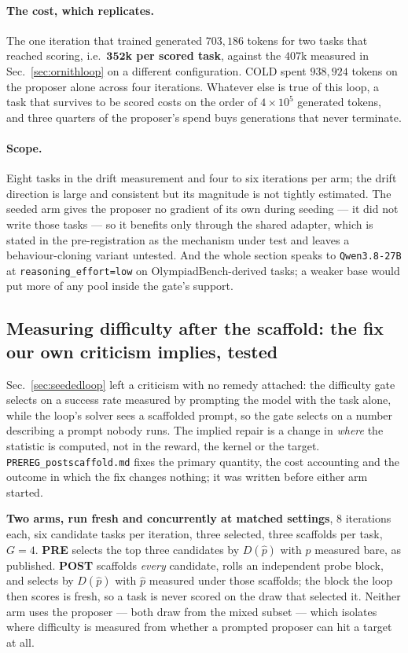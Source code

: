 \paragraph{The cost, which replicates.} The one iteration that trained generated $703{,}186$
tokens for two tasks that reached scoring, i.e.\ $\mathbf{352}$\textbf{k per scored task},
against the $407$k measured in Sec.~\ref{sec:ornithloop} on a different configuration. COLD
spent $938{,}924$ tokens on the proposer alone across four iterations. Whatever else is true of
this loop, a task that survives to be scored costs on the order of $4\times10^{5}$ generated
tokens, and three quarters of the proposer's spend buys generations that never terminate.

\paragraph{Scope.} Eight tasks in the drift measurement and four to six iterations per arm;
the drift direction is large and consistent but its magnitude is not tightly estimated. The
seeded arm gives the proposer no gradient of its own during seeding --- it did not write those
tasks --- so it benefits only through the shared adapter, which is stated in the
pre-registration as the mechanism under test and leaves a behaviour-cloning variant untested.
And the whole section speaks to \texttt{Qwen3.8-27B} at \texttt{reasoning\_effort=low} on
OlympiadBench-derived tasks; a weaker base would put more of any pool inside the gate's support.

\subsection{Measuring difficulty after the scaffold: the fix our own criticism implies, tested}
\label{sec:postscaffold}

Sec.~\ref{sec:seededloop} left a criticism with no remedy attached: the difficulty gate selects
on a success rate measured by prompting the model with the task alone, while the loop's solver
sees a scaffolded prompt, so the gate selects on a number describing a prompt nobody runs. The
implied repair is a change in \emph{where} the statistic is computed, not in the reward, the
kernel or the target. \texttt{PREREG\_postscaffold.md} fixes the primary quantity, the cost
accounting and the outcome in which the fix changes nothing; it was written before either arm
started.

\textbf{Two arms, run fresh and concurrently at matched settings}, $8$ iterations each, six
candidate tasks per iteration, three selected, three scaffolds per task, $G=4$.
\textbf{PRE} selects the top three candidates by $D(\hat p)$ with $\hat p$ measured bare, as
published. \textbf{POST} scaffolds \emph{every} candidate, rolls an independent probe block,
and selects by $D(\hat p)$ with $\hat p$ measured under those scaffolds; the block the loop
then scores is fresh, so a task is never scored on the draw that selected it. Neither arm uses
the proposer --- both draw from the mixed subset --- which isolates where difficulty is
measured from whether a prompted proposer can hit a target at all.

